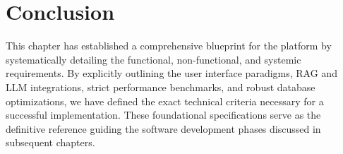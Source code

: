 \section*{Conclusion}
This chapter has established a comprehensive blueprint for the platform by systematically detailing the functional, non-functional, and systemic requirements. By explicitly outlining the user interface paradigms, RAG and LLM integrations, strict performance benchmarks, and robust database optimizations, we have defined the exact technical criteria necessary for a successful implementation. These foundational specifications serve as the definitive reference guiding the software development phases discussed in subsequent chapters.

\pagebreak